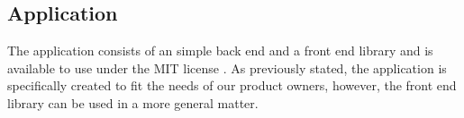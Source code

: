 

\subsection{Application}
The application consists of an simple back end and a front end library and is available to use under the MIT license \cite{_mit_????}. As previously stated, the application is specifically created to fit the needs of our product owners, however, the front end library can be used in a more general matter. %




